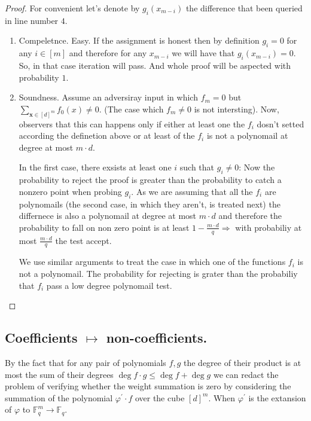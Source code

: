 \documentclass{article}
\newcommand{\FF}{\mathbb{F}_{q}}
\begin{document}
\begin{proof} For convenient let's denote by $g_{i}\left( x_{m-i} \right)$ the difference that been queried in line number $4$. 
  \begin{enumerate}
    \item Compeletnce. Easy. If the assignment is honest then by definition $g_{i} = 0$ for any $i \in [m]$ and therefore for any $x_{m-i}$ we will have that $g_{i} \left( x_{m-i} \right) = 0$. So, in that case iteration will pass. And whole proof will be aspected  with probability $1$.  
    \item Soundness. Assume an adversiray input in which $f_{m} = 0$ but $\sum_{\mathbf{x} \in [d]^{m}}{f_{0}(x)}\neq 0$. (The case which $f_{m} \neq 0$ is not intersting). Now, observers that this can happens only if either at least one the $f_{i}$ dosn't setted according the definetion above or at least of the $f_{i}$ is not a polynomail at degree at most $m\cdot d $. 

      In the first case, there exsists at least one $i$ such that $g_{i}\neq 0$:
      Now the probability to reject the proof is greater than the probability to catch a nonzero point when probing $g_{i}$. As we are assuming that all the $f_{i}$ are polynomails (the second case, in which they aren't, is treated next) the differnece is also a polynomail at degree at most $m\cdot d$ and therefore the probability to fall on non zero point is at least $1 - \frac{m\cdot d}{q} \Rightarrow $  with probabiliy at most $\frac{m\cdot d}{q}$ the test accept. 

      We use similar arguments to treat the case in which one of the functions $f_{i}$ is not a polynomail. The probability for rejecting is grater than the probabiliy that $f_{i}$ pass a low degree polynomail test. 
  \end{enumerate}
\end{proof}

\subsection{ Coefficients $\mapsto$ non-coefficients. }
By the fact that for any pair of polynomials $f,g$ the degree of their product is at most the sum of their degrees  $\deg f \cdot g \le \deg f + \deg g$  we can redact the problem of verifying whether the weight summation is zero by considering the summation of the polynomial $\varphi^{\prime} \cdot f$ over the cube $[d]^{m}$. When $\varphi^{\prime}$ is the extansion of $\varphi$  to $\FF^{m} \rightarrow \FF$. 
\end{document}
